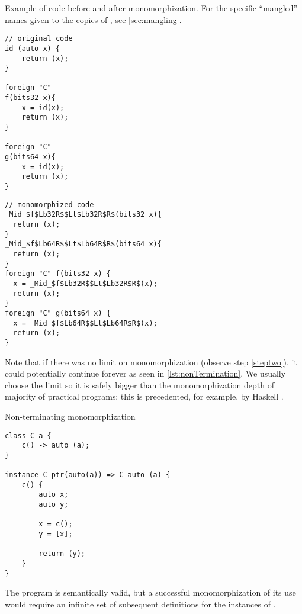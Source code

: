 \begin{listing}
    \caption{Example of code before and after monomorphization. For the specific ``mangled'' names given to the copies of , see \cref{sec:mangling}.}
    \label{lst:mono}
    \begin{center}
    \begin{minipage}{0.4\linewidth}
    \begin{lstlisting}
// original code
id (auto x) {
    return (x);
}

foreign "C"
f(bits32 x){
    x = id(x);
    return (x);
}

foreign "C"
g(bits64 x){
    x = id(x);
    return (x);
}
\end{lstlisting}
    \end{minipage}%
    \begin{minipage}{0.6\linewidth}
    \begin{lstlisting}
// monomorphized code
_Mid_$f$Lb32R$$Lt$Lb32R$R$(bits32 x){
  return (x);
}
_Mid_$f$Lb64R$$Lt$Lb64R$R$(bits64 x){
  return (x);
}
foreign "C" f(bits32 x) {
  x = _Mid_$f$Lb32R$$Lt$Lb32R$R$(x);
  return (x);
}
foreign "C" g(bits64 x) {
  x = _Mid_$f$Lb64R$$Lt$Lb64R$R$(x);
  return (x);
}
\end{lstlisting}
    \end{minipage}

    \end{center}
\end{listing}

Note that if there was no limit on monomorphization (observe step \ref{steptwo}), it could potentially continue forever as seen in \cref{lst:nonTermination}. We usually choose the limit so it is safely bigger than the monomorphization depth of majority of practical programs; this is precedented, for example, by Haskell \cite{haskell2010}.

\begin{listing}
    \caption{Non-terminating monomorphization}
    \label{lst:nonTermination}

    \begin{lstlisting}
class C a {
    c() -> auto (a);
}

instance C ptr(auto(a)) => C auto (a) {
    c() {
        auto x;
        auto y;

        x = c();
        y = [x];

        return (y);
    }
}
    \end{lstlisting}

    The program is semantically valid, but a successful monomorphization of its use would require an infinite set of subsequent definitions for the instances of .
\end{listing}

